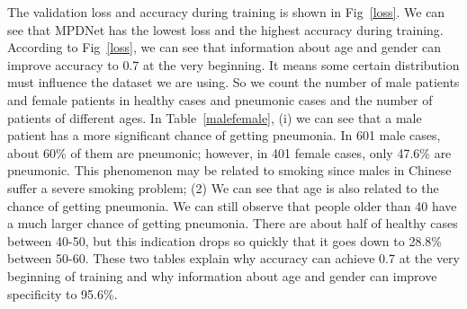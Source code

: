 The validation loss and accuracy during training is shown in Fig~\ref{loss}. We can see that MPDNet has the lowest loss and the highest accuracy during training.
According to Fig~\ref{loss}, we can see that information about age and gender can improve accuracy to 0.7 at the very beginning. It means some certain distribution must influence the dataset we are using. 
So we count the number of male patients and female patients in healthy cases and pneumonic cases and the number of patients of different ages. 
In Table~\ref{malefemale}, (i) we can see that a male patient has a more significant chance of getting pneumonia. In 601 male cases, about 60\% of them are pneumonic; however, in 401 female cases, only 47.6\% are pneumonic. This phenomenon may be related to smoking since males in Chinese suffer a severe smoking problem; (2) We can see that age is also related to the chance of getting pneumonia. We can still observe that people older than 40 have a much larger chance of getting pneumonia. There are about half of healthy cases between 40-50, but this indication drops so quickly that it goes down to 28.8\% between 50-60. These two tables explain why accuracy can achieve 0.7 at the very beginning of training and why information about age and gender can improve specificity to 95.6\%.




